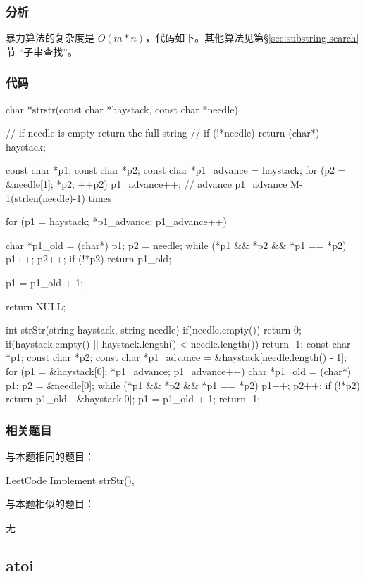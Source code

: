 \subsubsection{分析}
暴力算法的复杂度是 $O(m*n)$，代码如下。其他算法见第\S \ref{sec:substring-search}节 “子串查找”。

\subsubsection{代码}
\begin{Code}
char *strstr(const char *haystack, const char *needle) {
    // if needle is empty return the full string
    // if (!*needle) return (char*) haystack;

    const char *p1;
    const char *p2;
    const char *p1_advance = haystack;
    for (p2 = &needle[1]; *p2; ++p2) {
        p1_advance++;   // advance p1_advance M-1(strlen(needle)-1) times
    }

    for (p1 = haystack; *p1_advance; p1_advance++) {
        char *p1_old = (char*) p1;
        p2 = needle;
        while (*p1 && *p2 && *p1 == *p2) {
            p1++;
            p2++;
        }
        if (!*p2) return p1_old;

        p1 = p1_old + 1;
    }
    return NULL;
}
\end{Code}
\begin{NoteCode}
int strStr(string haystack, string needle) {
    if(needle.empty()) return 0;
    if(haystack.empty() || haystack.length() < needle.length()) return -1;
    const char *p1;
    const char *p2;
    const char *p1_advance = &haystack[needle.length() - 1];
    for (p1 = &haystack[0]; *p1_advance; p1_advance++) {
        char *p1_old = (char*) p1;
        p2 = &needle[0];
        while (*p1 && *p2 && *p1 == *p2) {
            p1++;
            p2++;
        }
        if (!*p2) return p1_old - &haystack[0];
        p1 = p1_old + 1;
    }
    return -1;
}
\end{NoteCode}


\subsubsection{相关题目}
与本题相同的题目：
\begindot
\item LeetCode Implement strStr(), 
\myenddot

与本题相似的题目：
\begindot
\item  无
\myenddot


\subsection{atoi}
\label{sec:string-to-integer}



